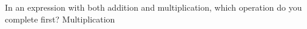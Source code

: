 {In an expression with both addition and multiplication, which operation do you complete first?}
{Multiplication}
